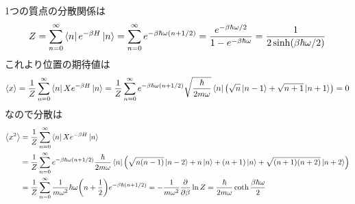 \documentclass[../../sp_2015.tex]{subfiles}
\begin{document}
\subsection{}
1つの質点の分散関係は
\begin{equation}\begin{aligned}[b]
    Z = \sum_{n=0}^{\infty}\bra{n}e^{-\beta H}\ket{n}
    = \sum_{n=0}^{\infty}e^{-\beta\hbar\omega(n+1/2)}
    =\frac{e^{-\beta\hbar\omega/2}}{1-e^{-\beta\hbar\omega}}
    = \frac{1}{2\sinh(\beta\hbar\omega/2)}
\end{aligned}\end{equation}
これより位置の期待値は
\begin{equation}\begin{aligned}[b]
    \ev{x} = \frac{1}{Z}\sum_{n=0}^{\infty}\bra{n}Xe^{-\beta H}\ket{n}
    = \frac{1}{Z}\sum_{n=0}^{\infty}e^{-\beta\hbar\omega(n+1/2)}
        \sqrt{\frac{\hbar}{2m\omega}}\bra{n}\qty(\sqrt{n}\ket{n-1}+\sqrt{n+1}\ket{n+1})
    = 0
\end{aligned}\end{equation}
なので分散は
\begin{equation}\begin{aligned}[b]
    \ev{x^2} &= \frac{1}{Z}\sum_{n=0}^{\infty}\bra{n}Xe^{-\beta H}\ket{n}\\
    &= \frac{1}{Z}\sum_{n=0}^{\infty}e^{-\beta\hbar\omega(n+1/2)}
        \frac{\hbar}{2m\omega}\bra{n}\qty(\sqrt{n(n-1)}\ket{n-2}+n\ket{n}+(n+1)\ket{n}+\sqrt{(n+1)(n+2)}\ket{n+2})\\
    &= \frac{1}{Z}\sum_{n=0}^{\infty} \frac{1}{m\omega^2}\hbar\omega\qty(n+\frac{1}{2})e^{-\beta\hbar(n+1/2)}
    = -\frac{1}{m\omega^2}\pdv{\beta}\ln Z =\frac{\hbar}{2m\omega}\coth\frac{\beta\hbar\omega}{2}
\end{aligned}\end{equation}
\end{document}
